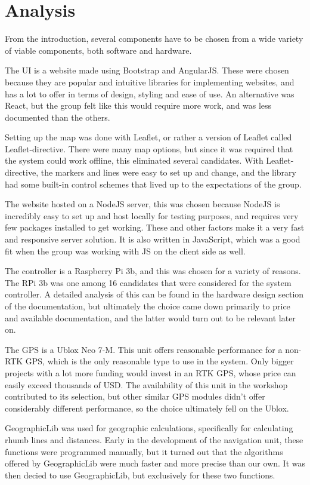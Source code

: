 \chapter{Analysis}
From the introduction, several components have to be chosen from a wide variety of viable components, both software and hardware.

The UI is a website made using Bootstrap and AngularJS. These were chosen because they are popular and intuitive libraries for implementing websites, and has a lot to offer in terms of design, styling and ease of use. An alternative was React, but the group felt like this would require more work, and was less documented than the others. 

Setting up the map was done with Leaflet, or rather a version of Leaflet called Leaflet-directive. There were many map options, but since it was required that the system could work offline, this eliminated several candidates. With Leaflet-directive, the markers and lines were easy to set up and change, and the library had some built-in control schemes that lived up to the expectations of the group.

The website hosted on a NodeJS server, this was chosen because NodeJS is incredibly easy to set up and host locally for testing purposes, and requires very few packages installed to get working. These and other factors make it a very fast and responsive server solution. It is also written in JavaScript, which was a good fit when the group was working with JS on the client side as well.

The controller is a Raspberry Pi 3b, and this was chosen for a variety of reasons. The RPi 3b was one among 16 candidates that were considered for the system controller. A detailed analysis of this can be found in the hardware design section of the documentation, but ultimately the choice came down primarily to price and available documentation, and the latter would turn out to be relevant later on.

The GPS is a Ublox Neo 7-M. This unit offers reasonable performance for a non-RTK GPS, which is the only reasonable type to use in the system. Only bigger projects with a lot more funding would invest in an RTK GPS, whose price can easily exceed thousands of USD. The availability of this unit in the workshop contributed to its selection, but other similar GPS modules didn't offer considerably different performance, so the choice ultimately fell on the Ublox.

GeographicLib was used for geographic calculations, specifically for calculating rhumb lines and distances. Early in the development of the navigation unit, these functions were programmed manually, but it turned out that the algorithms offered by GeographicLib were much faster and more precise than our own. It was then decied to use GeographicLib, but exclusively for these two functions.

